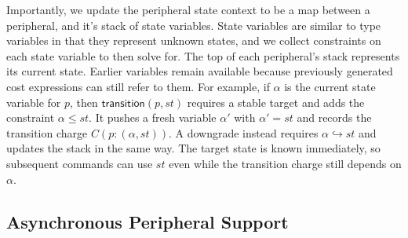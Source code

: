 Importantly, we update the peripheral state context to be a map between a peripheral, and it's stack of state variables. State variables are similar to type variables in that they represent unknown states, and we collect constraints on each state variable to then solve for. The top of each peripheral’s stack represents its current state. Earlier variables remain available because previously generated cost expressions can still refer to them. For example, if \(\alpha\) is the current state variable for \(p\), then \(\mathsf{transition}(p,st)\) requires a stable target and adds the constraint \(\alpha\le st\). It pushes a fresh variable \(\alpha'\) with \(\alpha'=st\) and records the transition charge \(C(p:(\alpha,st))\). A downgrade instead requires \(\alpha\hookrightarrow st\) and updates the stack in the same way. The target state is known immediately, so subsequent commands can use \(st\) even while the transition charge still depends on \(\alpha\).


\subsection{Asynchronous Peripheral Support}


